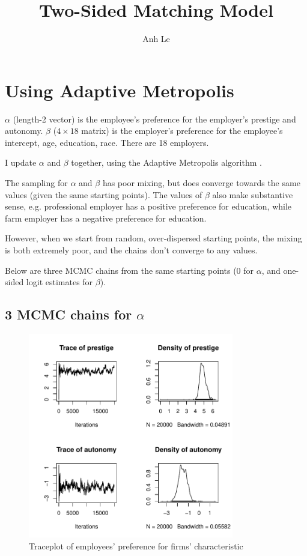 \documentclass[12pt]{article}
\title{Two-Sided Matching Model}
\author{Anh Le}
\begin{document}
\maketitle

\section{Using Adaptive Metropolis}

$\alpha$ (length-2 vector) is the employee's preference for the employer's
prestige and autonomy. $\beta$ ($4 \times 18$ matrix) is the employer's
preference for the employee's intercept, age, education, race. There are 18 employers.

I update $\alpha$ and $\beta$ together, using the Adaptive Metropolis algorithm
\citep{Haario2001}. 

The sampling for $\alpha$ and $\beta$ has poor mixing, but does converge towards the same
values (given the same starting points). The values of $\beta$ also make
substantive sense, e.g. professional employer has a positive preference for
education, while farm employer has a negative preference for education.

However, when we start from random, over-dispersed starting points, the mixing
is both extremely poor, and the chains don't converge to any values. 

Below are three MCMC chains from the
same starting points (0 for $\alpha$, and one-sided logit estimates for
$\beta$).

\subsection{3 MCMC chains for $\alpha$}

\begin{figure}[!ht]
\centering
\includegraphics[width=0.8\textwidth]{../figure/trace_alpha_adaptive_replicate1}
\caption{Traceplot of employees' preference for firms' characteristic}
\end{figure}
\end{document}
